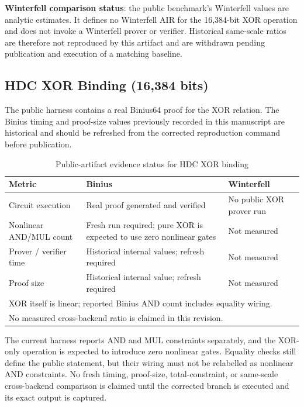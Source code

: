 \documentclass[11pt,twocolumn]{article}
\begin{document}
\textbf{Winterfell comparison status}: the public benchmark's Winterfell values are analytic estimates. It defines no Winterfell AIR for the 16,384-bit XOR operation and does not invoke a Winterfell prover or verifier. Historical same-scale ratios are therefore not reproduced by this artifact and are withdrawn pending publication and execution of a matching baseline.

\subsection{HDC XOR Binding (16,384 bits)}

The public harness contains a real Binius64 proof for the XOR relation. The Binius timing and proof-size values previously recorded in this manuscript are historical and should be refreshed from the corrected reproduction command before publication.

\begin{table}[t]
\centering
\caption{Public-artifact evidence status for HDC XOR binding}
\label{tab:xor_results}
\begin{tabular}{@{}lll@{}}
\toprule
\textbf{Metric} & \textbf{Binius} & \textbf{Winterfell} \\
\midrule
Circuit execution & Real proof generated and verified & No public XOR prover run \\
Nonlinear AND/MUL count & Fresh run required; pure XOR is expected to use zero nonlinear gates & Not measured \\
Prover / verifier time & Historical internal values; refresh required & Not measured \\
Proof size & Historical internal value; refresh required & Not measured \\
\bottomrule
\multicolumn{3}{l}{\footnotesize XOR itself is linear; reported Binius AND count includes equality wiring.} \\
\multicolumn{3}{l}{\footnotesize No measured cross-backend ratio is claimed in this revision.}
\end{tabular}
\end{table}

The current harness reports AND and MUL constraints separately, and the XOR-only operation is expected to introduce zero nonlinear gates. Equality checks still define the public statement, but their wiring must not be relabelled as nonlinear AND constraints. No fresh timing, proof-size, total-constraint, or same-scale cross-backend comparison is claimed until the corrected branch is executed and its exact output is captured.
\end{document}
